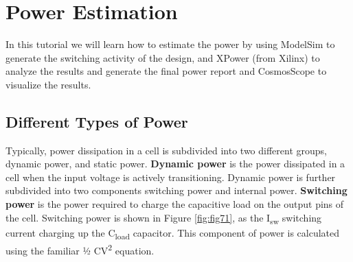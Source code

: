 \hypertarget{power-estimation}{%
\chapter{Power Estimation}\label{power-estimation}}

In this tutorial we will learn how to estimate the power by using
ModelSim to generate the switching activity of the design, and XPower
(from Xilinx) to analyze the results and generate the final power report
and CosmosScope to visualize the results.

\hypertarget{different-types-of-power}{%
\section{Different Types of Power}\label{different-types-of-power}}

Typically, power dissipation in a cell is subdivided into two different
groups, dynamic power, and static power. \textbf{Dynamic power} is the
power dissipated in a cell when the input voltage is actively
transitioning. Dynamic power is further subdivided into two components
switching power and internal power. \textbf{Switching power} is the
power required to charge the capacitive load on the output pins of the
cell. Switching power is shown in Figure \ref{fig:fig71},
as the I\textsubscript{sw} switching current charging up the
C\textsubscript{load} capacitor. This component of power is calculated
using the familiar ½ CV\textsuperscript{2} equation.

